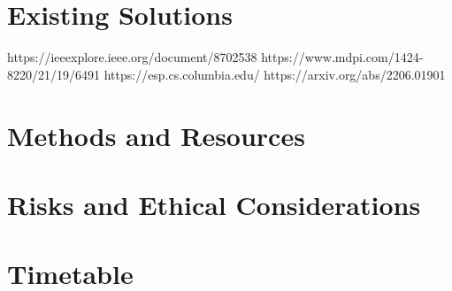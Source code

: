 \documentclass[a4paper,fleqn,12pt]{article}
\begin{document}
\section{Existing Solutions}
https://ieeexplore.ieee.org/document/8702538
https://www.mdpi.com/1424-8220/21/19/6491
https://esp.cs.columbia.edu/
https://arxiv.org/abs/2206.01901


\section{Methods and Resources}


\section{Risks and Ethical Considerations}

\section{Timetable}

% 
% 
% 
% 



\end{document}
